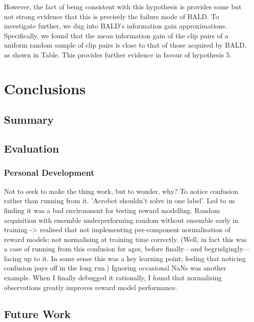 \documentclass[11pt, a4paper, bibliography=totoc]{report}
\begin{document}
However, the fact of being consistent with this hypothesis is provides some but not strong evidence that this is precisely the failure mode of BALD. To investigate further, we dug into BALD's information gain approximations. Specifically, we found that the mean information gain of the clip pairs of a uniform random sample of clip pairs is close to that of those acquired by BALD, as shown in Table. This provides further evidence in favour of hypothesis 5.

\chapter{Conclusions}
\section{Summary}
\section{Evaluation}
\subsection{Personal Development}
Not to seek to make the thing work, but to wonder, why? To notice confusion rather than running from it. 'Acrobot shouldn't solve in one label'. Led to us finding it was a bad environment for testing reward modelling.
Random acquisition with ensemble underperforming random without ensemble early in training -> realised that not implementing per-component normalisation of reward models; not normalising at training time correctly. (Well, in fact this was a case of running from this confusion for ages, before finally---and begrudgingly---facing up to it. In some sense this was a key learning point; feeling that noticing confusion pays off in the long run.)
Ignoring occasional NaNs was another example. When I finally debugged it rationally, I found that normalising observations greatly improves reward model performance.

\section{Future Work}




\end{document}
